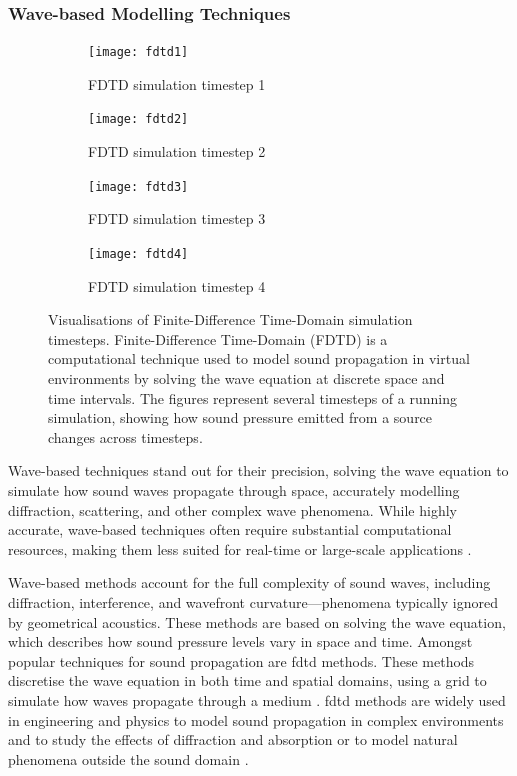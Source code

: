 \subsubsection{Wave-based Modelling Techniques}
\begin{figure}
    \begin{subfigure}{0.5\textwidth}
        \centering
        \texttt{[image: fdtd1]}
        \caption{FDTD simulation timestep 1}
    \end{subfigure}
    \begin{subfigure}{0.5\linewidth}
        \centering
        \texttt{[image: fdtd2]}
        \caption{FDTD simulation timestep 2}
    \end{subfigure}

    \begin{subfigure}{0.5\linewidth}
        \centering
        \texttt{[image: fdtd3]}
        \caption{FDTD simulation timestep 3}
    \end{subfigure}
    \begin{subfigure}{0.5\linewidth}
        \centering
        \texttt{[image: fdtd4]}
        \caption{FDTD simulation timestep 4}
    \end{subfigure}
    \caption[Visualisations of Finite-Difference Time-Domain simulation timesteps]{Visualisations of Finite-Difference Time-Domain simulation timesteps. Finite-Difference Time-Domain (FDTD) is a computational technique used to model sound propagation in virtual environments by solving the wave equation at discrete space and time intervals. The figures represent several timesteps of a running simulation, showing how sound pressure emitted from a source changes across timesteps.}\label{fig:fdtd-timesteps-example}
\end{figure}
Wave-based techniques stand out for their precision, solving the wave equation to simulate how sound waves propagate through space, accurately modelling diffraction, scattering, and other complex wave phenomena. While highly accurate, wave-based techniques often require substantial computational resources, making them less suited for real-time or large-scale applications \citep{raghuvanshi2014parametric}.\par
Wave-based methods account for the full complexity of sound waves, including diffraction, interference, and wavefront curvature—phenomena typically ignored by geometrical acoustics. These methods are based on solving the wave equation, which describes how sound pressure levels vary in space and time.
Amongst popular techniques for sound propagation are \acrfull{fdtd} methods. These methods discretise the wave equation in both time and spatial domains, using a grid to simulate how waves propagate through a medium \citep{hamilton2017fdtd}. \acrshort{fdtd} methods are widely used in engineering and physics to model sound propagation in complex environments and to study the effects of diffraction and absorption or to model natural phenomena outside the sound domain \citep{teixeira2023finite}.
